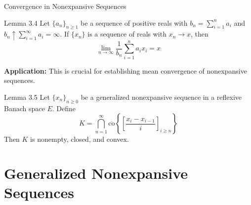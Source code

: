 \documentclass[aspectratio=169,10pt]{beamer}
\begin{document}
\begin{frame}{Convergence in Nonexpansive Sequences}
    \begin{block}{Lemma 3.4}
        Let $\{a_n\}_{n \geq 1}$ be a sequence of positive reals with $b_n = \sum_{i=1}^{n} a_i$ and
        $b_n \uparrow \sum_{i=1}^{\infty} a_i = \infty$. If $\{x_n\}$ is a sequence of reals with $x_n \to x$, then
        \[
        \lim_{n \to \infty} \frac{1}{b_n} \sum_{i=1}^{n} a_i x_i = x
        \]
    \end{block}

    \vspace{0.5cm}

    \textbf{Application:} This is crucial for establishing mean convergence of nonexpansive sequences.

    \vspace{0.3cm}

    \begin{block}{Lemma 3.5}
        Let $\{x_n\}_{n \geq 0}$ be a generalized nonexpansive sequence in a reflexive Banach space $E$. Define
        \[
        K = \bigcap_{n=1}^{\infty} \overline{\text{co}}\left\{\left[\frac{x_i - x_{i-1}}{i}\right]_{i \geq n}\right\}
        \]
        Then $K$ is nonempty, closed, and convex.
    \end{block}
\end{frame}

\section{Generalized Nonexpansive Sequences}
\end{document}
